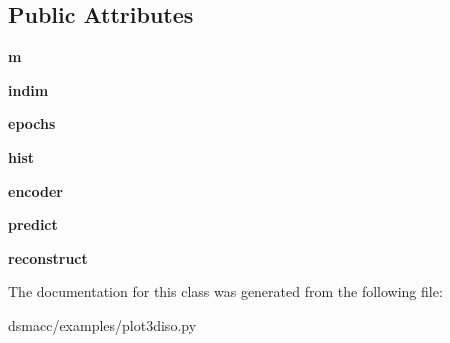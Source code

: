 \subsection*{Public Attributes}
\begin{DoxyCompactItemize}
\item 
\mbox{\label{classdsmacc_1_1examples_1_1plot3diso_1_1isoae_a0452d0b9a78b2868000c45fd6717216c}} 
{\bfseries m}
\item 
\mbox{\label{classdsmacc_1_1examples_1_1plot3diso_1_1isoae_a4f914fd156330c492bfd3aad563b5831}} 
{\bfseries indim}
\item 
\mbox{\label{classdsmacc_1_1examples_1_1plot3diso_1_1isoae_a6d8bd83a8f819f81ccbd147a64bba65b}} 
{\bfseries epochs}
\item 
\mbox{\label{classdsmacc_1_1examples_1_1plot3diso_1_1isoae_acdcea483fd67ea754e3cde180e873a2c}} 
{\bfseries hist}
\item 
\mbox{\label{classdsmacc_1_1examples_1_1plot3diso_1_1isoae_a5872bb0b825128eaa0d9b00a77cd477f}} 
{\bfseries encoder}
\item 
\mbox{\label{classdsmacc_1_1examples_1_1plot3diso_1_1isoae_aae8d765b00ce0edc3c1fed1602e072ea}} 
{\bfseries predict}
\item 
\mbox{\label{classdsmacc_1_1examples_1_1plot3diso_1_1isoae_a5e54d8ce5f3528f5da05d7c55383da11}} 
{\bfseries reconstruct}
\end{DoxyCompactItemize}


The documentation for this class was generated from the following file\+:\begin{DoxyCompactItemize}
\item 
dsmacc/examples/plot3diso.\+py\end{DoxyCompactItemize}
